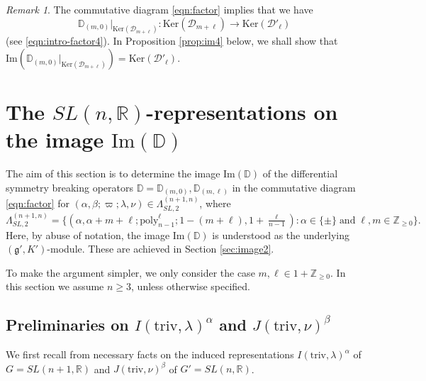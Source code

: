 \documentclass[reqno,11pt]{amsart}
\theoremstyle{remark}
\newtheorem{rem}[equation]{Remark}
\theoremstyle{definition}
\numberwithin{equation}{section}
\newcommand{\gb}{\beta}
\newcommand{\ga}{\alpha}
\newcommand{\gL}{\Lambda}
\newcommand{\fg}{{\mathfrak g}}
\newcommand{\R}{\mathbb{R}}
\newcommand{\Z}{\mathbb{Z}}
\newcommand{\Cal}{\mathcal}
\renewcommand{\Im}{\mathrm{Im}}
\newcommand{\poly}{\mathrm{poly}}
\newcommand{\To}{\longrightarrow}
\newcommand{\triv}{\mathrm{triv}}
\newcommand{\Ker}{\mathrm{Ker}}
\newcommand{\D}{\Cal{D}}
\newcommand{\bD}{\mathbb{D}}
\begin{document}
\begin{rem}
The commutative diagram \eqref{eqn:factor} implies that we have
\begin{equation*}
\bD_{(m,0)}\vert_{\Ker(\D_{m+\ell})}\colon 
\Ker(\D_{m+\ell}) \To \Ker(\D'_\ell)
\end{equation*}
(see \eqref{eqn:intro-factor4}).
In Proposition \ref{prop:im4} below, we shall show that  
$\Im(\bD_{(m,0)}\vert_{\Ker(\D_{m+\ell})})= \Ker(\D'_\ell)$.
\end{rem}

\section{The $SL(n,\R)$-representations on the image $\Im(\bD)$}
\label{sec:image}

The aim of this section is to determine the image $\Im(\bD)$ of the 
differential symmetry breaking operators
$\bD=\bD_{(m,0)}, \bD_{(m,\ell)}$ 
in the commutative diagram \eqref{eqn:factor}
for $(\ga,\gb;\varpi;\lambda ,\nu) \in 
\gL^{(n+1,n)}_{SL,2}$,
where
\begin{equation*}
\gL^{(n+1,n)}_{SL,2}=\{
(\alpha, \alpha+m+\ell;\poly_{n-1}^\ell; 1-(m+\ell), 
1+\tfrac{\ell}{n-1}) : \alpha \in \{\pm\} \; \text{and} \; \ell, m\in \Z_{\geq 0}\}.
\end{equation*}
Here, by abuse of notation, the image $\Im(\bD)$ is understood as the underlying $(\fg',K')$-module. 
These are achieved in Section \ref{sec:image2}.

To make the argument simpler, we only consider the case $m, \ell \in 1+\Z_{\geq 0}$.
In this section we assume $n\geq 3$, unless otherwise specified.



\subsection{Preliminaries on $I(\triv, \lambda)^\ga$ and $J(\triv, \nu)^\gb$}

We first recall from \cite{KuOr24} necessary facts on the induced 
representations $I(\triv, \lambda)^\ga$  of $G=SL(n+1,\R)$ and 
$J(\triv, \nu)^\gb$ of $G'=SL(n,\R)$. 
\end{document}
